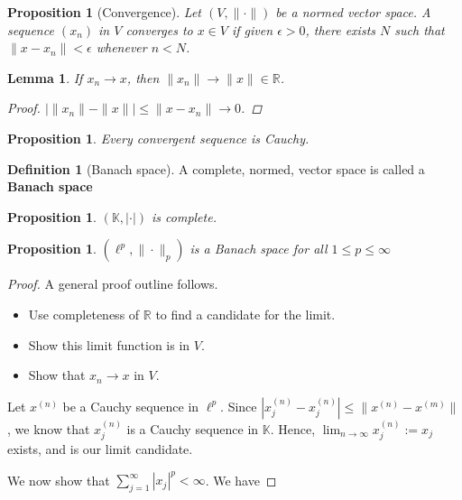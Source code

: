 \documentclass[10pt, oneside, reqno]{amsbook}
\theoremstyle{plain}%
\newtheorem{lem}[thm]{Lemma}
\newtheorem{prop}[thm]{Proposition}
\theoremstyle{definition}
\newtheorem{defn}[thm]{Definition}
\theoremstyle{remark}
\newcommand{\R}{\mathbb{R}}
\newcommand{\K}{\mathbb{K}}
\begin{document}


\begin{prop}[Convergence] Let $(V, \| \cdot \| )$ be a normed vector space.  A sequence $(x_n)$ in $V$ converges to $x \in V$ if given $\epsilon > 0$, there exists $N$ such that $\| x - x_n \| < \epsilon$ whenever $n < N$. 
\end{prop}

\begin{lem}
    If $x_n \rightarrow x$, then $\| x_n \| \rightarrow \| x \| \in \R$.
    \begin{proof}
        $\left| \| x_n \| - \| x \| \right| \leq \| x - x_n \| \rightarrow 0$.
    \end{proof}
\end{lem}

\begin{prop}
    Every convergent sequence is Cauchy.
\end{prop}

\begin{defn}[Banach space]
A complete, normed, vector space is called a \textbf{Banach space}
\end{defn}

\begin{prop}
    $( \K, |\cdot |)$ is complete.
\end{prop}

\begin{prop}
    $(\ell^p, \| \cdot \|_p)$ is a Banach space for all $1 \leq p \leq \infty$
\end{prop}

\begin{proof}
    A general proof outline follows.
    \begin{itemize}
        \item Use completeness of $\R$ to find a candidate for the limit.
        \item Show this limit function is in $V$.
        \item Show that $x_n \rightarrow x$ in $V$.
    \end{itemize}
    Let $x^{(n)}$ be a Cauchy sequence in $\ell^p$.  Since $|x_j^{(n)} - x_{j}^{(n)}| \leq \|x^{(n)} - x^{(m)}\|$, we know that $x^{(n)}_j$ is a Cauchy sequence in $\K$.  Hence, $\lim_{n \rightarrow \infty} x^{(n)}_j := x_j$ exists, and is our limit candidate.
    
    We now show that $\sum_{j =1}^\infty |x_j|^p < \infty$.  We have 
\end{proof}
\end{document}
